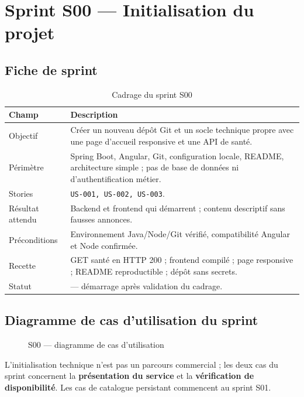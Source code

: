 \chapter{Sprint S00 --- Initialisation du projet}\label{ch:s00}
\section{Fiche de sprint}
\begin{table}[htbp]\centering\small
\caption{Cadrage du sprint S00}
\begin{tabularx}{\textwidth}{@{}P{31mm}Y@{}}\toprule
\textbf{Champ} & \textbf{Description}\\\midrule
Objectif & Créer un nouveau dépôt Git et un socle technique propre avec une page d’accueil responsive et une API de santé.\\
Périmètre & Spring Boot, Angular, Git, configuration locale, README, architecture simple ; pas de base de données ni d’authentification métier.\\
Stories & \texttt{US-001, US-002, US-003}.\\
Résultat attendu & Backend et frontend qui démarrent ; contenu descriptif sans fausses annonces.\\
Préconditions & Environnement Java/Node/Git vérifié, compatibilité Angular et Node confirmée.\\
Recette & GET santé en HTTP 200 ; frontend compilé ; page responsive ; README reproductible ; dépôt sans secrets.\\
Statut &  --- démarrage après validation du cadrage.\\
\bottomrule\end{tabularx}
\end{table}

\section{Diagramme de cas d’utilisation du sprint}
\begin{figure}[H]\centering
\caption{S00 --- diagramme de cas d’utilisation}\label{fig:s00-uc}\end{figure}
L’initialisation technique n’est pas un parcours commercial ; les deux cas du sprint concernent la \textbf{présentation du service} et la \textbf{vérification de disponibilité}. Les cas de catalogue persistant commencent au sprint S01.

